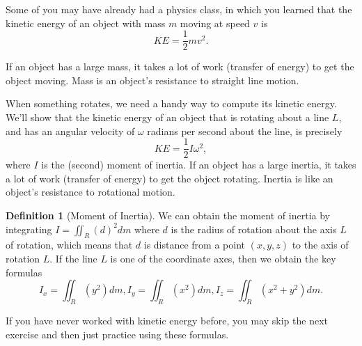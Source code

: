\documentclass[10pt,]{book}
\theoremstyle{plain}
\theoremstyle{definition}
\newtheorem{definition}[theorem]{Definition}
\theoremstyle{definition}
\theoremstyle{definition}
\theoremstyle{definition}
\theoremstyle{definition}
\numberwithin{equation}{section}
\begin{document}
\par
Some of you may have already had a physics class, in which you learned that the kinetic energy of an object with mass \(m\) moving at speed \(v\) is%
\begin{equation*}
KE = \frac{1}{2}mv^2.
\end{equation*}
%
\par
If an object has a large mass, it takes a lot of work (transfer of energy) to get the object moving. Mass is an object's resistance to straight line motion.%
\par
When something rotates, we need a handy way to compute its kinetic energy. We'll show that the kinetic energy of an object that is rotating about a line \(L\), and has an angular velocity of \(\omega\) radians per second about the line, is precisely %
\begin{equation*}
KE = \frac{1}{2}I \omega^2,
\end{equation*}
where \(I\) is the (second) moment of inertia. If an object has a large inertia, it takes a lot of work (transfer of energy) to get the object rotating. Inertia is like an object's resistance to rotational motion.%
\begin{definition}[{Moment of Inertia}]\label{definition-41}
We can obtain the moment of inertia by integrating \(I=\iint_R (d)^2 dm\) where \(d\) is the radius of rotation about the axis \(L\) of rotation, which means that \(d\) is distance from a point \((x,y,z)\) to the axis of rotation \(L\). If the line \(L\) is one of the coordinate axes, then we obtain the key formulas%
\begin{equation*}
I_x = \iint_R (y^2)dm,
I_y = \iint_R (x^2)dm,
I_z = \iint_R (x^2+y^2)dm
.
\end{equation*}
%
\end{definition}
If you have never worked with kinetic energy before, you may skip the next exercise and then just practice using these formulas.%
\end{document}

